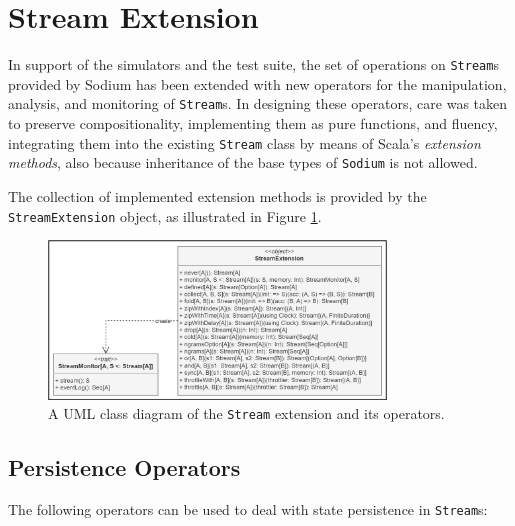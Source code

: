 
\section{Stream Extension}
\label{section:implementation:stream-extension}

In support of the simulators and the test suite, the set of operations on
\texttt{Stream}s provided by Sodium has been extended with new operators for
the manipulation, analysis, and monitoring of \texttt{Stream}s. In designing
these operators, care was taken to preserve compositionality, implementing them
as pure functions, and fluency, integrating them into the existing
\texttt{Stream} class by means of Scala's \textit{extension methods}, also
because inheritance of the base types of \texttt{Sodium} is not allowed.

The collection of implemented extension methods is provided by the
\texttt{StreamEx\-tension} object, as illustrated in Figure
\ref{figure:stream-extension-class-diagram}.

\begin{figure}[!ht]
  \centering
  \includegraphics[width=0.8\textwidth]{resources/figures/stream-extension-class-diagram.png}
  \caption{A UML class diagram of the \texttt{Stream} extension and its operators.}
  \label{figure:stream-extension-class-diagram}
\end{figure}

\subsection{Persistence Operators}

The following operators can be used to deal with state persistence in
\texttt{Stream}s:

